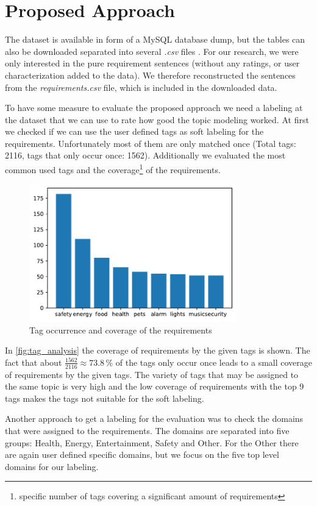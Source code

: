\section{Proposed Approach} %
\label{sec:own_approach}

The \crowdre{} dataset is available in form of a MySQL database dump, but the tables can also be downloaded separated into several \textit{.csv} files \cite{crowdre_dataset}. For our research, we were only interested in the pure requirement sentences (without any ratings, or user characterization added to the data). We therefore reconstructed the sentences from the \textit{requirements.csv} file, which is included in the downloaded data.

To have some measure to evaluate the proposed approach we need a labeling at the dataset that we can use to rate how good the topic modeling worked. At first we checked if we can use the user defined tags as soft labeling for the requirements. Unfortunately most of them are only matched once (Total tags: 2116, tags that only occur once: 1562). Additionally we evaluated the most common used tags and the coverage\footnote{specific number of tags covering a significant amount of requirements} of the requirements.

\begin{figure}[ht]
  \centering
    \includegraphics[width=0.8\textwidth]{screenshots/tag_analysis.pdf}
    \caption{Tag occurrence and coverage of the requirements}
    \label{fig:tag_analysis}
\end{figure}
\FloatBarrier

In \autoref{fig:tag_analysis} the coverage of requirements by the given tags is shown. The fact that about $\frac{1562}{2116}\approx73.8\,\%$ of the tags only occur once leads to a small coverage of requirements by the given tags. The variety of tags that may be assigned to the same topic is very high and the low coverage of requirements with the top 9 tags makes the tags not suitable for the soft labeling. 

Another approach to get a labeling for the evaluation was to check the domains that were assigned to the requirements. The domains are separated into five groups: Health, Energy, Entertainment, Safety and Other. For the \grqq{}Other\grqq{} there are again user defined specific domains, but we focus on the five top level domains for our labeling.




